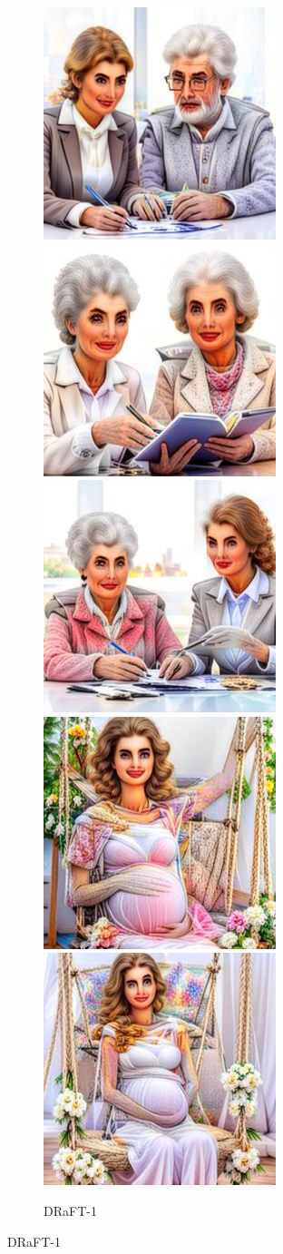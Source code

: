 \begin{figure}[h!]
\begin{subfigure}[t]{0.32\linewidth}
    \end{subfigure}\hfill
    \begin{subfigure}[t]{0.32\linewidth}
    \centering
    \caption*{DRaFT-1}
    	\includegraphics[width=0.32\linewidth]{figs/samples_appendix_4/draft1k_cfg_2_ode_prompt_12_image_0.jpg}\;%
    	\includegraphics[width=0.32\linewidth]{figs/samples_appendix_4/draft1k_cfg_2_ode_prompt_12_image_1.jpg}\;%
    	\includegraphics[width=0.32\linewidth]{figs/samples_appendix_4/draft1k_cfg_2_ode_prompt_12_image_2.jpg}\\ 
    	\includegraphics[width=0.32\linewidth]{figs/samples_appendix_4/draft1k_cfg_2_ode_prompt_16_image_0.jpg}\;%
    	\includegraphics[width=0.32\linewidth]{figs/samples_appendix_4/draft1k_cfg_2_ode_prompt_16_image_1.jpg}\;%

\end{subfigure}
\end{figure}
